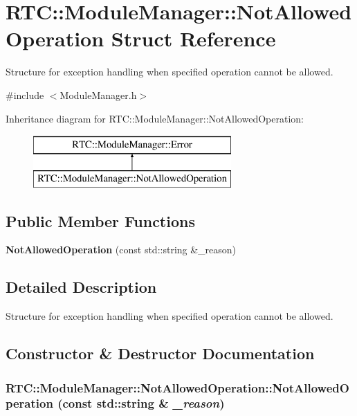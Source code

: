 \section{RTC::ModuleManager::NotAllowedOperation Struct Reference}
\label{structRTC_1_1ModuleManager_1_1NotAllowedOperation}


Structure for exception handling when specified operation cannot be allowed.  




{\ttfamily \#include $<$ModuleManager.h$>$}

Inheritance diagram for RTC::ModuleManager::NotAllowedOperation:\begin{figure}[H]
\begin{center}
\leavevmode
\includegraphics[height=2cm]{structRTC_1_1ModuleManager_1_1NotAllowedOperation}
\end{center}
\end{figure}
\subsection*{Public Member Functions}
\begin{DoxyCompactItemize}
\item 
{\bf NotAllowedOperation} (const std::string \&\_\-reason)
\end{DoxyCompactItemize}


\subsection{Detailed Description}
Structure for exception handling when specified operation cannot be allowed. 

\subsection{Constructor \& Destructor Documentation}
\subsubsection[{NotAllowedOperation}]{\setlength{\rightskip}{0pt plus 5cm}RTC::ModuleManager::NotAllowedOperation::NotAllowedOperation (const std::string \& {\em \_\-reason})\hspace{0.3cm}{\ttfamily  [inline]}}\label{structRTC_1_1ModuleManager_1_1NotAllowedOperation_ac7b43e23a013618df637bdd777c90dbc}
